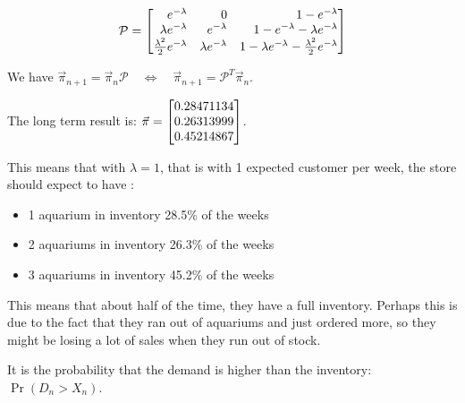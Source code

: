 \begin{solution}
\begin{slide}
\end{slide}

\begin{slide}
\begin{parts}
\setcounter{partsitem}{5}	

	\item \[ 
			\mathcal{P} 
				= \mat{ 	e^{-\lambda} & 0 & 1 - e^{-\lambda} \\
						\lambda e^{-\lambda} & e^{-\lambda} & 1 - e^{-\lambda} - \lambda e^{-\lambda} \\
						\frac{\lambda^2}{2} e^{-\lambda} & \lambda e^{-\lambda} & 1 - \lambda e^{-\lambda} - \frac{\lambda^2}{2}e^{-\lambda} }
			\]

	\item We have $\vec{\pi}_{n+1} = \vec{\pi}_n \mathcal{P} 
		 				\quad \Leftrightarrow \quad \vec{\pi}_{n+1} = \mathcal{P}^T \vec{\pi}_n$.
	\item The long term result is: $\vec{\pi} = \mat{0.28471134 \\0.26313999 \\0.45214867}$.


	This means that with $\lambda =1$, that is with 1 expected customer per week, the store should expect to have :
	\begin{itemize}
		\item 1 aquarium in inventory 28.5\% of the weeks
		\item 2 aquariums in inventory 26.3\% of the weeks
		\item 3 aquariums in inventory 45.2\% of the weeks
	\end{itemize}
	
	This means that about half of the time, they have a full inventory. Perhaps this is due to the fact that they ran out of aquariums and just ordered more, so they might be losing a lot of sales when they run out of stock.
	
	\item It is the probability that the demand is higher than the inventory: $\Pr(D_n > X_n)$. 
	
	\begin{slidesonly}
		\bigskip	
	\end{slidesonly}


\end{parts}
\end{slide}
\end{solution}
